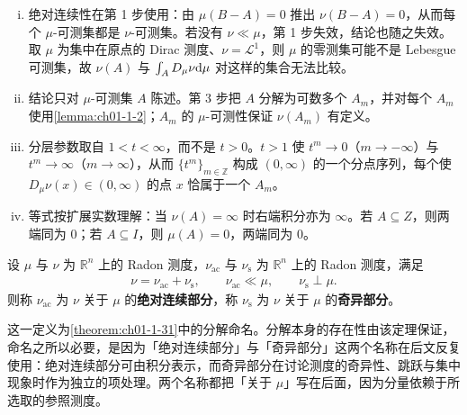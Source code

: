 \documentclass[../../main.tex]{subfiles}%
\begin{document}
\begin{remark}\label{remark:ch01-thm-1-30-条件}
\begin{enumerate}[(i)]
\item 绝对连续性在第 1 步使用：由 $\mu(B-A)=0$ 推出 $\nu(B-A)=0$，从而每个 $\mu$-可测集都是 $\nu$-可测集。若没有 $\nu\ll\mu$，第 1 步失效，结论也随之失效。取 $\mu$ 为集中在原点的 Dirac 测度、$\nu=\mathcal{L}^1$，则 $\mu$ 的零测集可能不是 Lebesgue 可测集，故 $\nu(A)$ 与 $\int_A D_{\mu}\nu\mathrm{d}\mu$ 对这样的集合无法比较。
\item 结论只对 $\mu$-可测集 $A$ 陈述。第 3 步把 $A$ 分解为可数多个 $A_m$，并对每个 $A_m$ 使用\cref{lemma:ch01-1-2}；$A_m$ 的 $\mu$-可测性保证 $\nu(A_m)$ 有定义。%
\item 分层参数取自 $1<t<\infty$，而不是 $t>0$。$t>1$ 使 $t^m\to0$（$m\to-\infty$）与 $t^m\to\infty$（$m\to\infty$），从而 $\{t^m\}_{m\in\mathbb{Z}}$ 构成 $(0,\infty)$ 的一个分点序列，每个使 $D_{\mu}\nu(x)\in(0,\infty)$ 的点 $x$ 恰属于一个 $A_m$。
\item 等式按扩展实数理解：当 $\nu(A)=\infty$ 时右端积分亦为 $\infty$。若 $A\subseteq Z$，则两端同为 $0$；若 $A\subseteq I$，则 $\mu(A)=0$，两端同为 $0$。
\end{enumerate}
\end{remark}

\begin{definition}[绝对连续部分与奇异部分]\label{definition:ch01-1-23}
设 $\mu$ 与 $\nu$ 为 $\mathbb{R}^n$ 上的 Radon 测度，$\nu_{\mathrm{ac}}$ 与 $\nu_{\mathrm{s}}$ 为 $\mathbb{R}^n$ 上的 Radon 测度，满足
\begin{align*}
\nu=\nu_{\mathrm{ac}}+\nu_{\mathrm{s}},\qquad \nu_{\mathrm{ac}}\ll\mu,\qquad \nu_{\mathrm{s}}\perp\mu .
\end{align*}
则称 $\nu_{\mathrm{ac}}$ 为 $\nu$ 关于 $\mu$ 的\textbf{绝对连续部分}，称 $\nu_{\mathrm{s}}$ 为 $\nu$ 关于 $\mu$ 的\textbf{奇异部分}。
\end{definition}

\begin{remark}\label{remark:ch01-def-1-23-动机}
这一定义为\cref{theorem:ch01-1-31}中的分解命名。分解本身的存在性由该定理保证，命名之所以必要，是因为「绝对连续部分」与「奇异部分」这两个名称在后文反复使用：绝对连续部分可由积分表示，而奇异部分在讨论测度的奇异性、跳跃与集中现象时作为独立的项处理。两个名称都把「关于 $\mu$」写在后面，因为分量依赖于所选取的参照测度。%
\end{remark}
\end{document}
